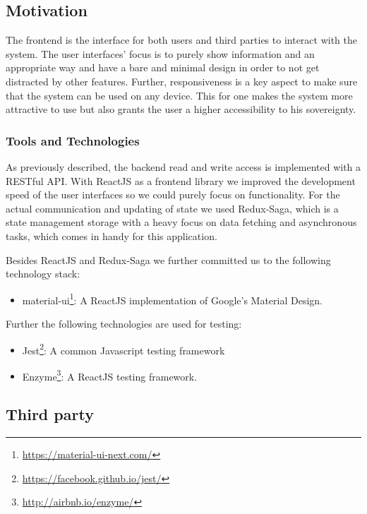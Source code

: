 \subsection{Motivation}

The frontend is the interface for both users and third parties to interact with the system.
The user interfaces' focus is to purely show information and an appropriate way and have a bare and minimal design
in order to not get distracted by other features.
Further, responsiveness is a key aspect to make sure that the system can be used on any device. This for one makes the
system more attractive to use but also grants the user a higher accessibility to his sovereignty.

\subsubsection{Tools and Technologies}

As previously described, the backend read and write access is implemented with a RESTful API.
With ReactJS as a frontend library we improved the development speed of the user interfaces so we could purely focus
on functionality.
For the actual communication and updating of state we used Redux-Saga, which is a state management storage with a heavy focus
on data fetching and asynchronous tasks, which comes in handy for this application.

Besides ReactJS and Redux-Saga we further committed us to the following technology stack:

\begin{itemize}
\item material-ui\footnote{\url{https://material-ui-next.com/}}: A ReactJS implementation of Google's Material Design.
\end{itemize}

Further the following technologies are used for testing:

\begin{itemize}
\item Jest\footnote{\url{https://facebook.github.io/jest/}}: A common Javascript testing framework
\item Enzyme\footnote{\url{http://airbnb.io/enzyme/}}: A ReactJS testing framework.
\end{itemize}

\subsection{Third party}

